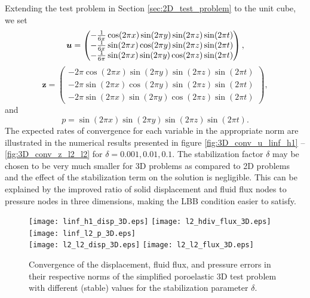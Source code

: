Extending the test problem in Section \ref{sec:2D_test_problem} to the unit cube, we set
\begin{equation*}
 \boldsymbol{u} = \begin{pmatrix}
 -\frac{1}{6\pi}\cos(2\pi x)\sin(2\pi y)\sin(2\pi z)\sin(2\pi t)  \\
 -\frac{1}{6\pi}\sin(2\pi x)\cos(2\pi y)\sin(2\pi z)\sin(2\pi t)  \\
  -\frac{1}{6\pi}\sin(2\pi x)\sin(2\pi y)\cos(2\pi z)\sin(2\pi t)
 \end{pmatrix},
\end{equation*}
\begin{equation*}
 \mathbf{z} =\begin{pmatrix}
 -2\pi\cos(2\pi x)\sin(2\pi y)\sin(2\pi z)\sin(2\pi t)  \\
 -2\pi\sin(2\pi x)\cos(2\pi y)\sin(2\pi z)\sin(2\pi t)  \\
 -2\pi\sin(2\pi x)\sin(2\pi y)\cos(2\pi z)\sin(2\pi t)
 \end{pmatrix},
\end{equation*}
and
\begin{equation*}
p=\sin(2\pi x)\sin(2\pi y)\sin(2\pi z)\sin(2\pi t).
\end{equation*}
The expected rates of convergence for each variable in the appropriate norm are illustrated in the numerical results presented in figure \ref{fig:3D_conv_u_linf_h1} --  \ref{fig:3D_conv_z_l2_l2} for $\delta=0.001,0.01,0.1$.  The stabilization factor $\delta$ may be chosen to be very much smaller for 3D problems as compared to 2D problems and the effect of the stabilization term on the solution is negligible. This can be explained by the improved ratio of solid displacement and fluid flux nodes to pressure nodes in three dimensions, making the LBB condition easier to satisfy.

\begin{figure}[H]
\begin{center}
  \subfloat[]{\label{fig:3D_conv_u_linf_h1}}  {\texttt{[image: linf\_h1\_disp\_3D.eps]}}
  \subfloat[]{\label{fig:3D_conv_divz_l2_l2}} {\texttt{[image: l2\_hdiv\_flux\_3D.eps]}}
  \subfloat[]{\label{fig:3D_conv_p_linf_l2}}  {\texttt{[image: linf\_l2\_p\_3D.eps]}}    \\
  \subfloat[]{\label{fig:3D_conv_u_l2_l2}}    {\texttt{[image: l2\_l2\_disp\_3D.eps]}}
  \subfloat[]{\label{fig:3D_conv_z_l2_l2}}    {\texttt{[image: l2\_l2\_flux\_3D.eps]}}
\caption{Convergence of the displacement, fluid flux, and pressure errors in their respective norms of the simplified poroelastic 3D test problem with different (stable) values for the stabilization parameter $ \delta$.}
\end{center}
\end{figure}


